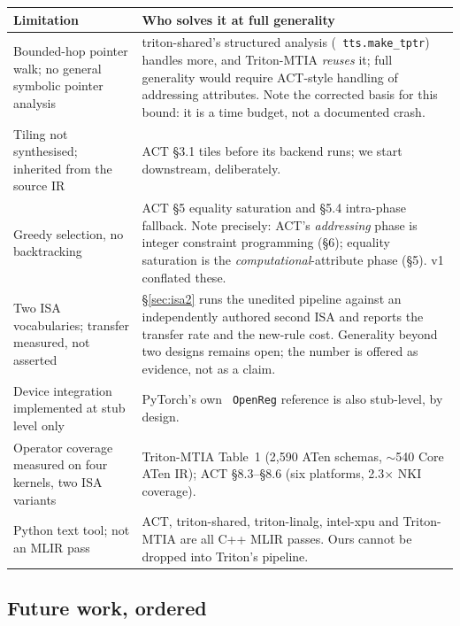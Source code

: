 \documentclass[11pt,a4paper]{article}
\newcommand{\code}[1]{\texttt{\small\hyphenchar\font=45 #1}}
\begin{document}
\begin{center}
\begin{tabularx}{\textwidth}{@{}>{\raggedright\arraybackslash}p{4.2cm} >{\raggedright\arraybackslash}X@{}}
\toprule
\textbf{Limitation} & \textbf{Who solves it at full generality} \\
\midrule
Bounded-hop pointer walk; no general symbolic pointer analysis & triton-shared's structured analysis
(\code{tts.make\_tptr}) handles more, and Triton-MTIA \emph{reuses} it; full generality would require
ACT-style handling of addressing attributes. Note the corrected basis for this bound: it is a time budget,
not a documented crash. \\
\addlinespace
Tiling not synthesised; inherited from the source IR & ACT \S3.1 tiles before its backend runs; we start
downstream, deliberately. \\
\addlinespace
Greedy selection, no backtracking & ACT \S5 equality saturation and \S5.4 intra-phase fallback. Note
precisely: ACT's \emph{addressing} phase is integer constraint programming (\S6); equality saturation is the
\emph{computational}-attribute phase (\S5). v1 conflated these. \\
\addlinespace
Two ISA vocabularies; transfer measured, not asserted & \S\ref{sec:isa2} runs the unedited pipeline against
an independently authored second ISA and reports the transfer rate and the new-rule cost. Generality beyond
two designs remains open; the number is offered as evidence, not as a claim. \\
\addlinespace
Device integration implemented at stub level only & PyTorch's own \code{OpenReg} reference is also
stub-level, by design. \\
\addlinespace
Operator coverage measured on four kernels, two ISA variants & Triton-MTIA Table~1 (2{,}590 ATen schemas,
$\sim$540 Core ATen IR); ACT \S8.3--\S8.6 (six platforms, 2.3$\times$ NKI coverage). \\
\addlinespace
Python text tool; not an MLIR pass & ACT, triton-shared, triton-linalg, intel-xpu and Triton-MTIA are all
C++ MLIR passes. Ours cannot be dropped into Triton's pipeline. \\
\bottomrule
\end{tabularx}
\end{center}

\subsection{Future work, ordered}
\end{document}
